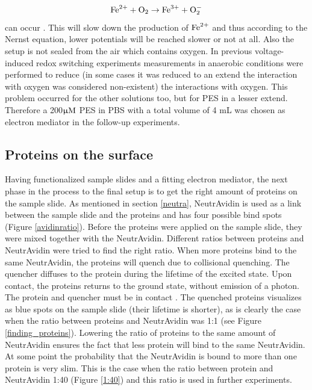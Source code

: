 \documentclass[twoside,single]{lion-msc}
\begin{document}
$$\textup{Fe}^{2+}+\textup{O}_{2}\rightarrow\textup{Fe}^{3+}+\textup{O}_{2}^{-} $$
can occur \cite{Grady1991}. This will slow down the production of $\textup{Fe}^{2+}$ and thus according to the Nernst equation, lower potentials will be reached slower or not at all. Also the setup is not sealed from the air which contains oxygen. In previous voltage-induced redox switching experiments\cite{Akkilic2015} measurements in anaerobic conditions were performed to reduce (in some cases it was reduced to an extend the interaction with oxygen was considered non-existent) the interactions with oxygen. This problem occurred for the other solutions too, but for PES in a lesser extend. Therefore a 200$\upmu \textup{M}$ PES in PBS with a total volume of 4 mL was chosen as electron mediator in the follow-up experiments.
 

\subsection{Proteins on the surface}
Having functionalized sample slides and a fitting electron mediator, the next phase in the process to the final setup is to get the right amount of proteins on the sample slide. As mentioned in section \ref{neutra},  NeutrAvidin is used as a link between the sample slide and the proteins and has four possible bind spots  (Figure \ref{avidinratio}). Before the proteins were applied on the sample slide, they were mixed together with the NeutrAvidin. Different ratios between proteins and NeutrAvidin were tried to find the right ratio. When more proteins bind to the same NeutrAvidin, the proteins will quench due to collisional quenching. The quencher diffuses to the protein during the lifetime of the excited state. Upon contact, the proteins returns to the ground state, without emission of a photon. The protein and quencher must be in contact \cite{Lakowicz2006}. The quenched proteins visualizes as blue spots on the sample slide (their lifetime is shorter), as is clearly the case when the ratio between proteins and NeutrAvidin was 1:1 (see Figure \ref{finding_proteins}). Lowering the ratio of proteins to the same amount of NeutrAvidin ensures the fact that less protein will bind to the same NeutrAvidin. At some point the probability that the NeutrAvidin is bound to more than one protein is very slim. This is the case when the ratio between protein and NeutrAvidin 1:40 (Figure \ref{1:40}) and this ratio is used in further experiments.
\end{document}
